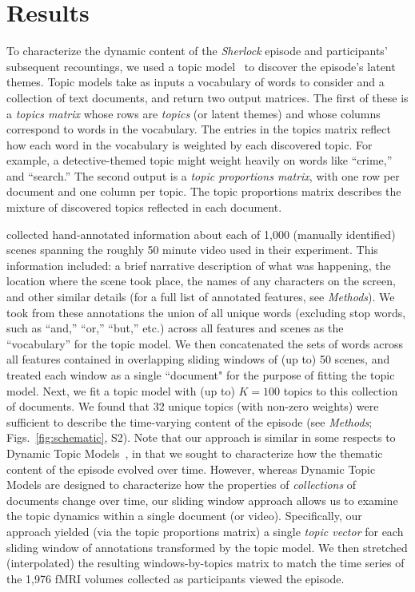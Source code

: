 \documentclass{article}
\newcommand{\topics}{S2}
\begin{document}
\section*{Results}
To characterize the dynamic content of the \textit{Sherlock} episode and participants' subsequent recountings, we used a topic model~\citep{BleiEtal03} to discover the episode's latent themes.  Topic models take as inputs a vocabulary of words to consider and a collection of text documents, and return two output matrices.  The first of these is a \textit{topics matrix} whose rows are \textit{topics} (or latent themes) and whose columns correspond to words in the vocabulary. The entries in the topics matrix reflect how each word in the vocabulary is weighted by each discovered topic.  For example, a detective-themed topic might weight heavily on words like ``crime,'' and ``search.''  The second output is a \textit{topic proportions matrix}, with one row per document and one column per topic.  The topic proportions matrix describes the mixture of discovered topics reflected in each document.

\cite{ChenEtal17} collected hand-annotated information about each of 1,000 (manually identified) scenes spanning the roughly 50 minute video used in their experiment.  This information included: a brief narrative description of what was happening, the location where the scene took place, the names of any characters on the screen, and other similar details (for a full list of annotated features, see \textit{Methods}).  We took from these annotations the union of all unique words (excluding stop words, such as ``and,'' ``or,'' ``but,'' etc.) across all features and scenes as the ``vocabulary'' for the topic model.  We then concatenated the sets of words across all features contained in overlapping sliding windows of (up to) 50 scenes, and treated each window as a single ``document" for the purpose of fitting the topic model.  Next, we fit a topic model with (up to) $K = 100$ topics to this collection of documents.  We found that 32 unique topics (with non-zero weights) were sufficient to describe the time-varying content of the episode (see \textit{Methods}; Figs.~\ref{fig:schematic}, \topics).  Note that our approach is similar in some respects to Dynamic Topic Models~\citep{BleiLaff06}, in that we sought to characterize how the thematic content of the episode evolved over time.  However, whereas Dynamic Topic Models are designed to characterize how the properties of \textit{collections} of documents change over time, our sliding window approach allows us to examine the topic dynamics within a single document (or video).  Specifically, our approach yielded (via the topic proportions matrix) a single \textit{topic vector} for each sliding window of annotations transformed by the topic model.  We then stretched (interpolated) the resulting windows-by-topics matrix to match the time series of the 1,976 fMRI volumes collected as participants viewed the episode.
\end{document}
